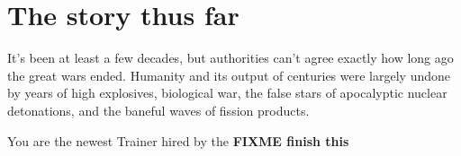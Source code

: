 \chapter{The story thus far}
\label{chap:story}
It's been at least a few decades, but authorities can't
  agree exactly how long ago the great wars ended.
Humanity and its output of centuries were largely undone by
 years of high explosives, biological war, the false stars
 of apocalyptic nuclear detonations, and the baneful
 waves of fission products.

You are the newest Trainer hired by the
\textbf{FIXME finish this}
